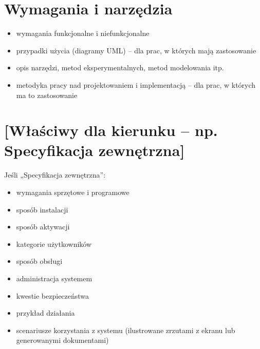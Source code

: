 \documentclass[a4paper,twoside,12pt]{book}
\begin{document}





\chapter{Wymagania i narzędzia}
\label{ch:wymagania-i-narzedzia}

\begin{itemize}
\item wymagania funkcjonalne i niefunkcjonalne
\item przypadki użycia (diagramy UML) -- dla prac, w których mają zastosowanie
\item opis narzędzi, metod eksperymentalnych, metod modelowania itp.
\item metodyka pracy nad projektowaniem i implementacją -- dla prac, w których ma to zastosowanie
\end{itemize}


\chapter{[Właściwy dla kierunku -- np. Specyfikacja zewnętrzna]}
\label{ch:04}

Jeśli „Specyfikacja zewnętrzna”:
\begin{itemize}
\item  wymagania sprzętowe i programowe
\item  sposób instalacji
\item  sposób aktywacji
\item  kategorie użytkowników
\item  sposób obsługi
\item  administracja systemem
\item  kwestie bezpieczeństwa
\item  przykład działania
\item  scenariusze korzystania z systemu (ilustrowane zrzutami z ekranu lub generowanymi dokumentami)
\end{itemize}
\end{document}
